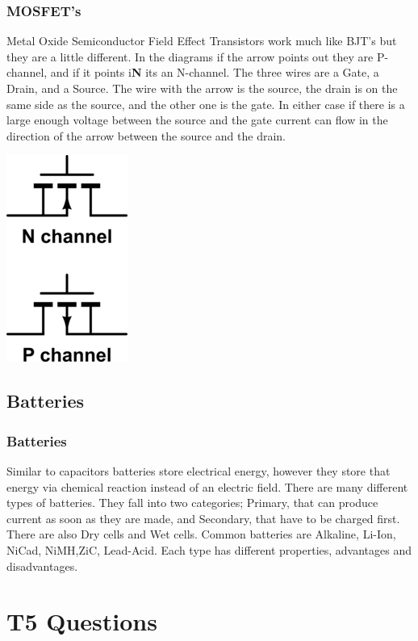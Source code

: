 \documentclass[10pt]{beamer}
\begin{document}
\begin{frame}
\frametitle{MOSFET's}
Metal Oxide Semiconductor Field Effect Transistors work much like BJT's but they are a little different. In the diagrams if the arrow points out they are P-channel, and if it points i\textbf{N} its an N-channel. The three wires are a Gate, a Drain, and a Source. The wire with the arrow is the source, the drain is on the same side as the source, and the other one is the gate. In either case if there is a large enough voltage between the source and the gate current can flow in the direction of the arrow between the source and the drain.
\begin{center}
\includegraphics{mosfets.png}
\end{center}
\end{frame}

\subsection{Batteries}
\begin{frame}
\frametitle{Batteries}
Similar to capacitors batteries store electrical energy, however they store that energy via chemical reaction instead of an electric field. There are many different types of batteries. They fall into two categories; Primary, that can produce current as soon as they are made, and Secondary, that have to be charged first. There are also Dry cells and Wet cells. Common batteries are Alkaline, Li-Ion, NiCad, NiMH,ZiC, Lead-Acid. Each type has different properties, advantages and disadvantages.
\end{frame}

\section{T5 Questions}
\end{document}

